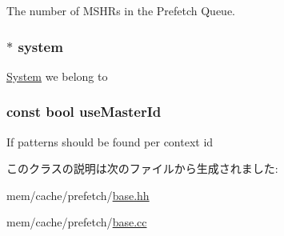 \label{classBasePrefetcher_ad3f1cf0299fe68eb9a68a7c67232c62d}
The number of MSHRs in the Prefetch Queue. \hypertarget{classBasePrefetcher_af27ccd765f13a4b7bd119dc7579e2746}{
\subsubsection[{system}]{$\ast$ {\bf system}}}
\label{classBasePrefetcher_af27ccd765f13a4b7bd119dc7579e2746}
\hyperlink{classSystem}{System} we belong to \hypertarget{classBasePrefetcher_ab84f738213bbd5196080f894c0d5aaf2}{
\subsubsection[{useMasterId}]{\setlength{\rightskip}{0pt plus 5cm}const bool {\bf useMasterId}}}
\label{classBasePrefetcher_ab84f738213bbd5196080f894c0d5aaf2}
If patterns should be found per context id 

このクラスの説明は次のファイルから生成されました:\begin{DoxyCompactItemize}
\item 
mem/cache/prefetch/\hyperlink{mem_2cache_2prefetch_2base_8hh}{base.hh}\item 
mem/cache/prefetch/\hyperlink{mem_2cache_2prefetch_2base_8cc}{base.cc}\end{DoxyCompactItemize}
